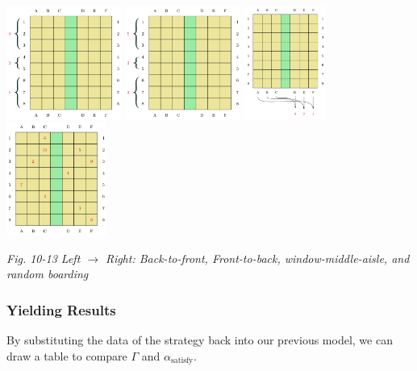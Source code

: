 \documentclass{article}
\theoremstyle{definition}
\theoremstyle{remark}
\numberwithin{equation}{section}
\begin{document}
	\begin{center}
		\includegraphics[height=3.7cm]{planerow1.jpg}
		\includegraphics[height=3.7cm]{planerow2.jpg}
		\includegraphics[height=3.7cm]{wdmd.jpg}
		\includegraphics[height=3.7cm]{planerandom.jpg}

		\small \textit{Fig. 10-13 Left \(\to\) Right: Back-to-front, Front-to-back, window-middle-aisle, and random boarding}
	\end{center}
	\subsubsection{Yielding Results}

	By substituting the data of the strategy back into our previous model, we can draw a table to compare $\Gamma$ and $\alpha_\text{satisfy}$.
\end{document}
